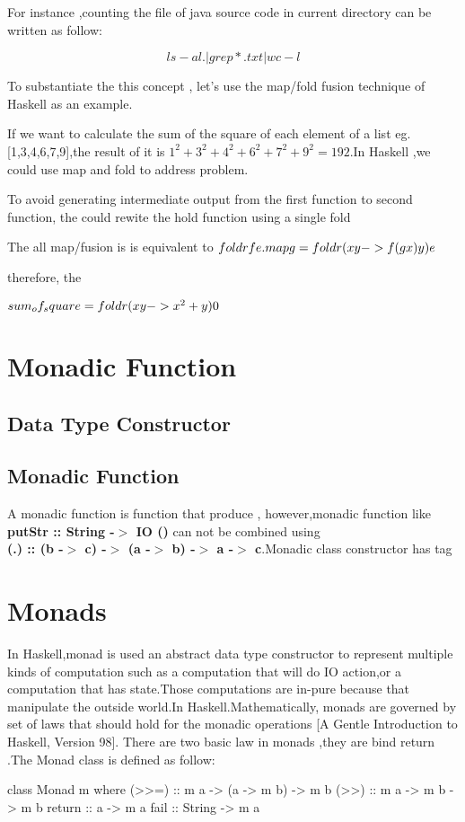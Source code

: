 For instance ,counting the file of java source code in current directory can be written as follow:


	$$ ls-al . | grep *.txt| wc -l $$ 
	
	
To substantiate the this concept , let's use the map/fold fusion technique of Haskell as an example.

If we want to calculate the sum of the square of each element of a list eg. [1,3,4,6,7,9],the result of it is  $ 1^2+3^2+4^2+6^2+7^2+9^2=192 $.In Haskell ,we could use map and fold to address problem.


To avoid generating intermediate output from the first function to second function, the could rewite the hold function using a single fold

The all map/fusion is is equivalent to 
$ foldr f e . map g = foldr (\\x y -> f (g x) y) e $

therefore, the 

$ sum_of_square = foldr (\\x y -> x^2 + y) 0 $





\section{Monadic Function}
\subsection{Data Type Constructor}

\subsection{Monadic Function}
A monadic function is function that produce , however,monadic function like \textbf{putStr :: String -$>$ IO ()} can not be combined using \\ \textbf{(.) :: (b -$>$ c) -$>$ (a -$>$ b) -$>$ a -$>$ c}.Monadic class constructor has tag 



\section{Monads}
In Haskell,monad is used an abstract data type constructor to represent multiple kinds of computation such as a computation that will do IO action,or a computation that has state.Those computations are in-pure because that manipulate the outside world.In Haskell.Mathematically, monads are governed by set of laws that should hold for the monadic operations [A Gentle Introduction to Haskell, Version 98]. There are two basic law in monads ,they are bind return .The Monad class is defined as follow:
\begin{hcode}
class Monad m where
  (>>=) :: m a -> (a -> m b) -> m b
  (>>) :: m a -> m b -> m b
  return :: a -> m a
  fail :: String -> m a
\end{hcode}

